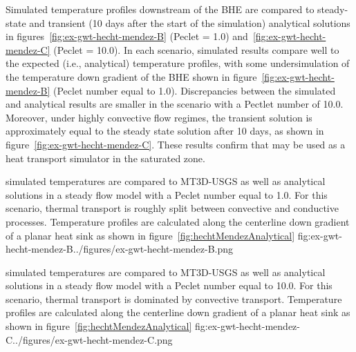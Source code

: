 Simulated temperature profiles downstream of the BHE are compared to steady-state and transient (10 days after the start of the simulation) analytical solutions in figures~\ref{fig:ex-gwt-hecht-mendez-B} (Peclet = 1.0) and~\ref{fig:ex-gwt-hecht-mendez-C} (Peclet = 10.0).  In each scenario, simulated results compare well to the expected (i.e., analytical) temperature profiles, with some undersimulation of the temperature down gradient of the BHE shown in figure~\ref{fig:ex-gwt-hecht-mendez-B} (Peclet number equal to 1.0).  Discrepancies between the simulated and analytical results are smaller in the scenario with a Pectlet number of 10.0.  Moreover, under highly convective flow regimes, the transient solution is approximately equal to the steady state solution after 10 days, as shown in figure~\ref{fig:ex-gwt-hecht-mendez-C}.  These results confirm that \mf may be used as a heat transport simulator in the saturated zone.

\begin{StandardFigure}{
                                     \mf simulated temperatures are compared to MT3D-USGS as well as analytical solutions in a steady flow model with a Peclet number equal to 1.0. For this scenario, thermal transport is roughly split between convective and conductive processes.  Temperature profiles are calculated along the centerline down gradient of a planar heat sink as shown in figure~\ref{fig:hechtMendezAnalytical}
                                     }{fig:ex-gwt-hecht-mendez-B}{../figures/ex-gwt-hecht-mendez-B.png}
\end{StandardFigure}                                 

\begin{StandardFigure}{
                                     \mf simulated temperatures are compared to MT3D-USGS as well as analytical solutions in a steady flow model with a Peclet number equal to 10.0. For this scenario, thermal transport is dominated by convective transport.  Temperature profiles are calculated along the centerline down gradient of a planar heat sink as shown in figure~\ref{fig:hechtMendezAnalytical}
                                     }{fig:ex-gwt-hecht-mendez-C}{../figures/ex-gwt-hecht-mendez-C.png}
\end{StandardFigure}             
                    
